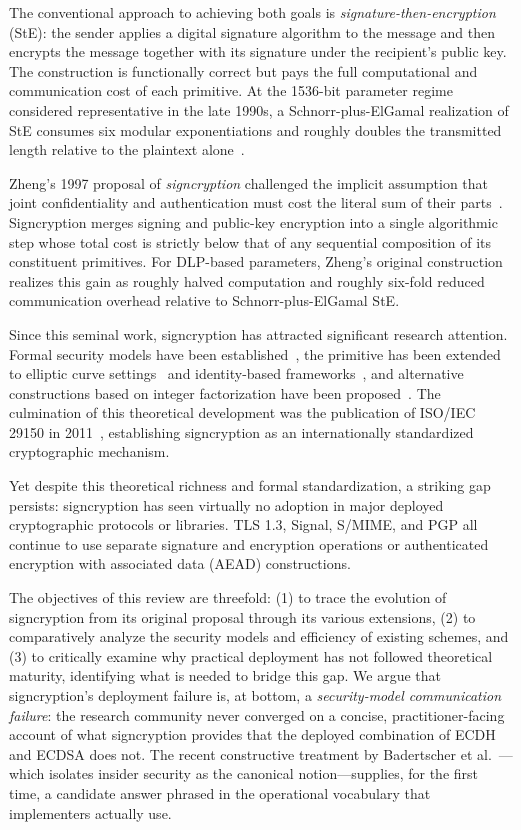 \documentclass[conference]{IEEEtran}
\begin{document}
The conventional approach to achieving both goals is \textit{signature-then-encryption} (StE): the sender applies a digital signature algorithm to the message and then encrypts the message together with its signature under the recipient's public key. The construction is functionally correct but pays the full computational and communication cost of each primitive. At the 1536-bit parameter regime considered representative in the late 1990s, a Schnorr-plus-ElGamal realization of StE consumes six modular exponentiations and roughly doubles the transmitted length relative to the plaintext alone~\cite{zheng1997}.

Zheng's 1997 proposal of \textit{signcryption} challenged the implicit assumption that joint confidentiality and authentication must cost the literal sum of their parts~\cite{zheng1997}. Signcryption merges signing and public-key encryption into a single algorithmic step whose total cost is strictly below that of any sequential composition of its constituent primitives. For DLP-based parameters, Zheng's original construction realizes this gain as roughly halved computation and roughly six-fold reduced communication overhead relative to Schnorr-plus-ElGamal StE.

Since this seminal work, signcryption has attracted significant research attention. Formal security models have been established~\cite{baek2002, an2002, baek2007}, the primitive has been extended to elliptic curve settings~\cite{zheng1998} and identity-based frameworks~\cite{malonelee2002, boyen2003}, and alternative constructions based on integer factorization have been proposed~\cite{steinfeld2000}. The culmination of this theoretical development was the publication of ISO/IEC 29150 in 2011~\cite{iso29150}, establishing signcryption as an internationally standardized cryptographic mechanism.

Yet despite this theoretical richness and formal standardization, a striking gap persists: signcryption has seen virtually no adoption in major deployed cryptographic protocols or libraries. TLS 1.3, Signal, S/MIME, and PGP all continue to use separate signature and encryption operations or authenticated encryption with associated data (AEAD) constructions.

The objectives of this review are threefold: (1) to trace the evolution of signcryption from its original proposal through its various extensions, (2) to comparatively analyze the security models and efficiency of existing schemes, and (3) to critically examine why practical deployment has not followed theoretical maturity, identifying what is needed to bridge this gap. We argue that signcryption's deployment failure is, at bottom, a \textit{security-model communication failure}: the research community never converged on a concise, practitioner-facing account of what signcryption provides that the deployed combination of ECDH and ECDSA does not. The recent constructive treatment by Badertscher et al.~\cite{badertscher2018}---which isolates insider security as the canonical notion---supplies, for the first time, a candidate answer phrased in the operational vocabulary that implementers actually use.
\end{document}
